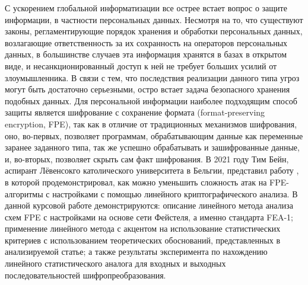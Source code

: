\Introduction

 С ускорением глобальной информатизации все острее встает вопрос о защите информации, в частности персональных данных. Несмотря на то, что существуют законы, регламентирующие порядок хранения и обработки персональных данных, возлагающие ответственность за их сохранность на операторов персональных данных, в большинстве случаев эта информация хранятся в базах в открытом виде, и несанкционированный доступ к ней не требует больших усилий от злоумышленника. В связи с тем, что последствия реализации данного типа угроз могут быть достаточно серьезными, остро встает задача безопасного хранения подобных данных. Для персональной информации наиболее подходящим способ защиты является шифрование с сохранение формата (format-preserving encryption, FPE), так как в отличие от традиционных механизмов шифрования, оно, во-первых, позволяет программам, обрабатывающим данные как переменные заранее заданного типа, так же успешно обрабатывать и зашифрованные данные, и, во-вторых, позволяет скрыть сам факт шифрования. 
 В 2021 году  Тим Бейн, аспирант Лёвенсокго католического университета в Бельгии, представил работу \cite{main_paper}, в которой продемонстрировал, как можно уменьшить сложность атак на FPE-алгоритмы с настройками с помощью линейного криптографического анализа. В данной курсовой работе демонстрируются: описание линейного метода анализа схем FPE с настройками на основе сети Фейстеля, а именно стандарта FEA-1; применение линейного метода с акцентом на использование статистических критериев с использованием теоретических обоснований, представленных в анализируемой статье; а также результаты эксперимента по нахождению линейного статистического аналога для входных и выходных последовательностей шифропреобразования.

